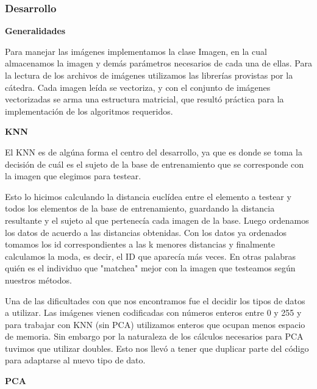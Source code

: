 \subsubsection*{Desarrollo}
\textbf{Generalidades}

Para manejar las imágenes implementamos la clase Imagen, en la cual almacenamos la imagen y demás parámetros necesarios de cada una de ellas.
Para la lectura de los archivos de imágenes utilizamos las librerías provistas por la cátedra.
Cada imagen leída se vectoriza, y con el conjunto de imágenes vectorizadas se arma una estructura matricial, que resultó práctica para la implementación de los algoritmos requeridos.

\textbf{KNN}

El KNN es de algúna forma el centro del desarrollo, ya que es donde se toma la decisión de cuál es el sujeto de la base de entrenamiento que se corresponde con la imagen que elegimos para testear.

Esto lo hicimos calculando la distancia euclídea entre el elemento a testear y todos los elementos de la base de entrenamiento, guardando la distancia resultante y el sujeto al que pertenecía cada imagen de la base. Luego ordenamos los datos de acuerdo a las distancias obtenidas. Con los datos ya ordenados tomamos los id correspondientes a las k menores distancias y finalmente calculamos la moda, es decir, el ID que  aparecía más veces. En otras palabras quién es el individuo que "matchea" mejor con la imagen que testeamos según nuestros métodos. 

\par Una de las dificultades con que nos encontramos fue el decidir los tipos de datos a utilizar. Las imágenes vienen codificadas con números enteros entre 0 y 255 y para trabajar con KNN (sin PCA) utilizamos enteros que ocupan menos espacio de memoria. Sin embargo por la naturaleza de los cálculos necesarios para PCA tuvimos que utilizar doubles. Esto nos llevó a tener que duplicar parte del código para adaptarse al nuevo tipo de dato.


\textbf{PCA}


